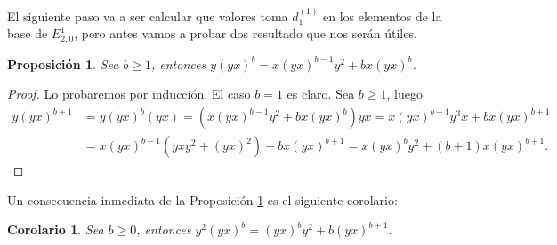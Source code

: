 \documentclass[a4paper,oneside,fleqn,11pt]{article}
\newtheorem{prop}{Proposición}
\newtheorem{coro}{Corolario}
\numberwithin{prop}{subsection}
\begin{document}
El siguiente paso va a ser calcular que valores toma $d_1^{(1)}$ en los elementos de la base de $E^1_{2, 0}$, pero antes
vamos a probar dos resultado que nos serán útiles.
\begin{prop}
\label{conmutary}
Sea $b \geq 1$, entonces $y(yx)^b = x(yx)^{b - 1}y^2 + bx(yx)^b$.
\end{prop}
\begin{proof}
Lo probaremos por inducción. El caso $b = 1$ es claro. Sea $b \geq 1$, luego
\begin{align*}
	y(yx)^{b + 1} &= y(yx)^b(yx) = (x(yx)^{b - 1}y^2 + bx(yx)^b)yx = x(yx)^{b - 1}y^3x + bx(yx)^{b + 1}\\
	&= x(yx)^{b - 1}(yxy^2 + (yx)^2) + bx(yx)^{b + 1} = x(yx)^{b}y^2 + (b + 1)x(yx)^{b + 1}.
\end{align*}
\end{proof}
Un consecuencia inmediata de la Proposición \ref{conmutary} es el siguiente corolario:
\begin{coro}
\label{conmutary^2}
Sea $b \geq 0$, entonces $y^2(yx)^b = (yx)^{b}y^2 + b(yx)^{b + 1}$.
\end{coro}
\end{document}
